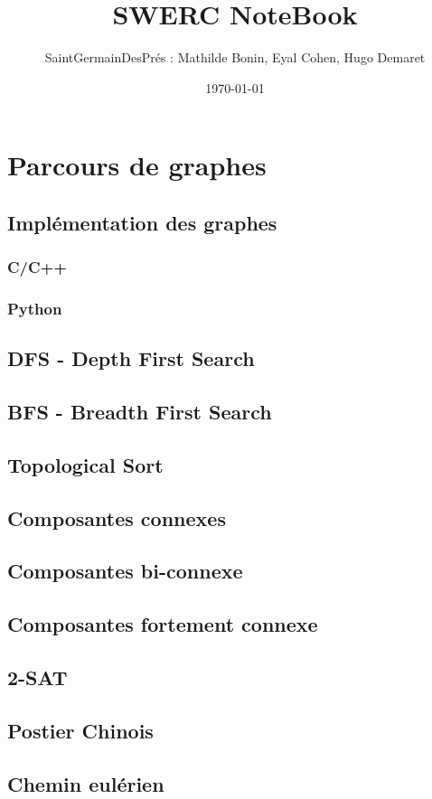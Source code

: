 \documentclass[8pt]{article}
\title{SWERC NoteBook}
\author{SaintGermainDesPrés : Mathilde Bonin, Eyal Cohen, Hugo Demaret}
\date\today
\begin{document}
    \maketitle
    \section{Parcours de graphes}
        \subsection{Implémentation des graphes}
            \subsubsection{C/C++}
            \subsubsection{Python}
        \subsection{DFS - Depth First Search}
        \subsection{BFS - Breadth First Search}
        \subsection{Topological Sort}
        \subsection{Composantes connexes}
        \subsection{Composantes bi-connexe}
        \subsection{Composantes fortement connexe}
        \subsection{2-SAT}
        \subsection{Postier Chinois}
        \subsection{Chemin eulérien}
\end{document}
